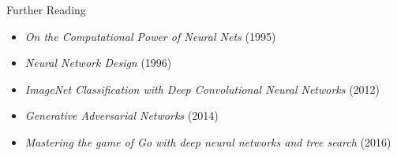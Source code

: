 \documentclass[11pt]{beamer}
\begin{document}
\begin{frame}{Further Reading}
\begin{itemize}
    \item \textit{On the Computational Power of Neural Nets} (1995)
    \item \textit{Neural Network Design} (1996)
    \item \textit{ImageNet Classification with Deep Convolutional Neural Networks} (2012)
    \item \textit{Generative Adversarial Networks} (2014)
    \item \textit{Mastering the game of Go with deep neural networks and tree search} (2016)
\end{itemize}
\end{frame}
\end{document}
